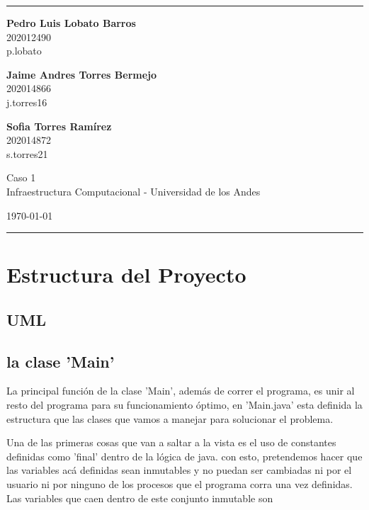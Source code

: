 \documentclass[a4paper]{article}
\begin{document}

\fancyhead[C]{}
\hrule \medskip %
\begin{minipage}{0.295\textwidth} 
\raggedright
\footnotesize
\textbf{Pedro Luis Lobato Barros} \hfill\\    
202012490\hfill\\
p.lobato

\textbf{Jaime Andres Torres Bermejo} \hfill\\   
202014866\hfill\\
j.torres16

\textbf{Sofia Torres Ramírez} \hfill\\   
202014872\hfill\\
s.torres21

\end{minipage}
\begin{minipage}{0.4\textwidth} 
\centering 
\large 
Caso 1\\ 
\normalsize 
Infraestructura Computacional - Universidad de los Andes\\ 
\end{minipage}
\begin{minipage}{0.295\textwidth} 
\raggedleft
\today\hfill\\
\end{minipage}
\medskip\hrule 
\bigskip


\section{Estructura del Proyecto}
    
    \subsection{UML}
    
    \subsection{la clase 'Main'}

    La principal función de la clase 'Main', además de correr el programa,
    es unir al resto del programa para su funcionamiento óptimo, en 'Main.java'
    esta definida la estructura que las clases que vamos a manejar para solucionar
    el problema.

    Una de las primeras cosas que van a saltar a la vista es el uso de constantes
    definidas como 'final' dentro de la lógica de java. con esto, pretendemos 
    hacer que las variables acá definidas sean inmutables y no puedan ser cambiadas
    ni por el usuario ni por ninguno de los procesos que el programa corra una vez
    definidas. Las variables que caen dentro de este conjunto inmutable son
\end{document}
